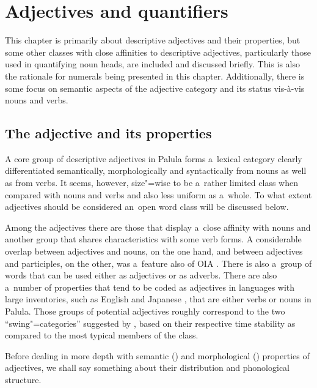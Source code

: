 \chapter{Adjectives and quantifiers}
\label{chap:6}

This chapter is primarily about descriptive adjectives and their properties, but some other classes with close affinities to descriptive adjectives, particularly those used in quantifying noun heads, are included and discussed briefly. This is also the rationale for numerals being presented in this chapter. Additionally, there is some focus on semantic aspects of the adjective category and its status vis-à-vis nouns and verbs.


\section{The adjective and its properties}
\label{sec:6-1}


A core group of descriptive adjectives in Palula forms a~lexical category clearly differentiated semantically, morphologically and syntactically from nouns as well as from verbs. It seems, however, size"=wise to be a~rather limited class when compared with nouns and verbs and also less uniform as a~whole. To what extent adjectives should be considered an~open word class will be discussed below. 



Among the adjectives there are those that display a~close affinity with nouns and another group that shares characteristics with some verb forms. A considerable overlap between adjectives and nouns, on the one hand, and between adjectives and participles, on the other, was a~feature also of OIA \citep[322, 967]{whitney1960}. There is also a~group of words that can be used either as adjectives or as adverbs. There are also a~number of properties that tend to be coded as adjectives in languages with large inventories, such as English and Japanese \citep[60]{pustet2006}, that are either verbs or nouns in Palula. Those groups of potential adjectives roughly correspond to the two ``swing"=categories'' suggested by \citet[321]{givon1979}, based on their respective time stability as compared to the most typical members of the class.



Before dealing in more depth with semantic () and morphological () properties of adjectives, we shall say something about their distribution and phonological structure. 



